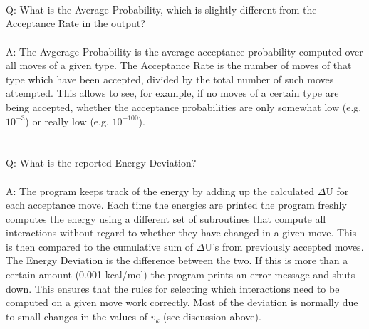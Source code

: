 \documentclass{article}      %
\begin{document}
\\\\\\
Q:  What is the Average Probability, which is slightly different from the Acceptance Rate in the output?
\\\\
A:  The Avgerage Probability is the average acceptance probability computed over all moves of a given type. The Acceptance Rate is the number of moves of that type which have been accepted, divided by the total number of such moves attempted. This allows to see, for example, if no moves of a certain type are being accepted, whether the acceptance probabilities are only somewhat low (e.g. $10^{-3}$) or really low (e.g. $10^{-100}$).
\\\\\\
Q:  What is the reported Energy Deviation?
\\\\
A:  The program keeps track of the energy by adding up the calculated $\Delta$U for each acceptance move. Each time the energies are printed the program freshly computes the energy using a different set of subroutines that compute all interactions without regard to whether they have changed in a given move.  This is then compared to the cumulative sum of $\Delta$U's from previously accepted moves. The Energy Deviation is the difference between the two. If this is more than a certain amount (0.001 kcal/mol) the program prints an error message and shuts down. This ensures that the rules for selecting which interactions need to be computed on a given move work correctly. Most of the deviation is normally due to small changes in the values of $v_{k}$ (see discussion above).
\end{document}
